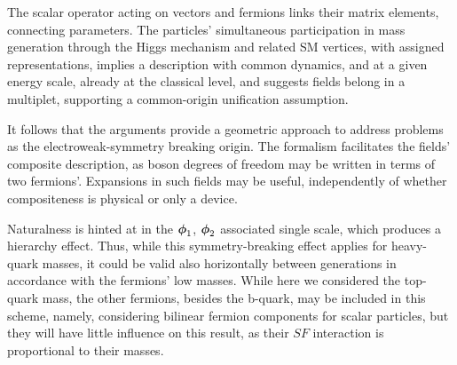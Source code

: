 \documentclass[12pt]{article}
\renewcommand\[{\begin{dmath}}
\renewcommand\]{\end{dmath}}
\newcommand{\boldmathphi}{\mbox{\boldmath$\phi$\unboldmath}}
\begin{document}


The scalar operator  acting   on vectors and fermions links their matrix elements, connecting parameters.
  The    particles'   simultaneous  participation in mass generation through   the   Higgs mechanism and   related  SM  vertices,
  with assigned representations, implies   a  description  with common dynamics, and at a  given energy scale,
     already at the classical level, and
         suggests   fields belong in a  multiplet,     supporting a  common-origin unification assumption\cite{BesproRicardo}.

It follows that  the arguments provide  a geometric approach  to address   problems  as the electroweak-symmetry breaking origin.
The formalism facilitates the   fields'  composite description,  as boson degrees of freedom may be written in terms of two fermions'.
Expansions in such fields   may be useful, independently of whether compositeness is  physical or only a  device.


Naturalness is hinted at in  the  $ {\boldmathphi }_1$,  ${\boldmathphi  }_2$    associated single scale, which produces a hierarchy effect\cite{BesproRicardo}.
 Thus, while this  symmetry-breaking   effect applies  for heavy-quark masses,
   it could be valid also horizontally between generations in accordance  with the   fermions' low masses.
While here we considered the top-quark mass,  the other fermions, besides the b-quark, may be included in this scheme, namely, considering bilinear  fermion components for scalar particles,
but they will have  little influence on this result, as their $SF$  interaction is   proportional to their masses.
\end{document}
